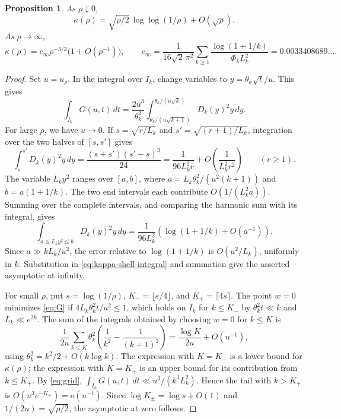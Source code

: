 \documentclass[11pt]{amsart}
\newtheorem{proposition}[theorem]{Proposition}
\theoremstyle{remark}
\begin{document}
\begin{proposition}
\label{prop:kappa-endpoints}
As \(\rho\downarrow0\),
\[
 \kappa(\rho)=\sqrt{\rho/2}\,\log\log(1/\rho)+O(\sqrt\rho).
\]
As \(\rho\to\infty\),
\[
 \kappa(\rho)=c_\infty\rho^{-3/2}\bigl(1+O(\rho^{-1})\bigr),
 \qquad
 c_\infty=\frac{1}{16\sqrt2\,\pi^2}
      \sum_{k\ge1}\frac{\log(1+1/k)}{\Phi_k L_k^2}
      =0.0033408689\ldots .
\]
\end{proposition}

\begin{proof}
Set \(u=u_\rho\). In the integral over \(I_k\), change variables
to \(y=\theta_k\sqrt t/u\). This gives
\begin{equation}
 \int_{I_k}G(u,t)\,dt
 =\frac{2u^3}{\theta_k^2}\int_{\theta_k/(u\sqrt{k+1})}^{\theta_k/(u\sqrt k)}
       D_k(y)^2 y\,dy.
 \label{eq:kappa-shell-integral}
\end{equation}
For large \(\rho\), we have \(u\to0\). If \(s=\sqrt{r/L_k}\) and
\(s'=\sqrt{(r+1)/L_k}\), integration over the two halves of \([s,s']\)
gives
\[
 \int_s^{s'}D_k(y)^2y\,dy
 =\frac{(s+s')(s'-s)^3}{24}
 =\frac{1}{96L_k^2r}+O\!\left(\frac1{L_k^2r^2}\right)
 \qquad(r\ge1).
\]
The variable \(L_ky^2\) ranges over \([a,b]\), where
\(a=L_k\theta_k^2/(u^2(k+1))\) and \(b=a(1+1/k)\).
The two end intervals each contribute \(O(1/(L_k^2a))\).
Summing over the complete intervals, and comparing the harmonic
sum with its integral, gives
\[
 \int_{a\le L_ky^2\le b}D_k(y)^2y\,dy
 =\frac{1}{96L_k^2}\left(\log(1+1/k)+O(a^{-1})\right).
\]
Since \(a\gg kL_k/u^2\), the error relative to \(\log(1+1/k)\)
is \(O(u^2/L_k)\), uniformly in \(k\). Substitution in
\eqref{eq:kappa-shell-integral} and summation give the asserted
asymptotic at infinity.

For small \(\rho\), put \(s=\log(1/\rho)\), \(K_-=\lfloor s/4\rfloor\),
and \(K_+=\lceil4s\rceil\). The point \(w=0\) minimizes \eqref{eq:G}
if \(4L_k\theta_k^2t/u^2\le1\), which holds on \(I_k\) for \(k\le K_-\)
by \(\theta_k^2t\ll k\) and \(L_k\ll e^{2k}\). The sum of the
integrals obtained by choosing \(w=0\) for \(k\le K\) is
\[
 \frac{1}{2u}\sum_{k\le K}\theta_k^2
          \left(\frac1{k^2}-\frac1{(k+1)^2}\right)
 =\frac{\log K}{2u}+O(u^{-1}),
\]
using \(\theta_k^2=k^2/2+O(k\log k)\).
The expression with \(K=K_-\) is a lower bound for \(\kappa(\rho)\);
the expression with \(K=K_+\) is an upper bound for its contribution
from \(k\le K_+\). By \eqref{eq:grid},
\(\int_{I_k}G(u,t)\,dt\ll u^3/(k^3L_k^2)\). Hence the tail with
\(k>K_+\) is \(O(u^3e^{-K_+})=o(u^{-1})\). Since
\(\log K_\pm=\log s+O(1)\) and \(1/(2u)=\sqrt{\rho/2}\), the
asymptotic at zero follows.
\end{proof}
\end{document}
